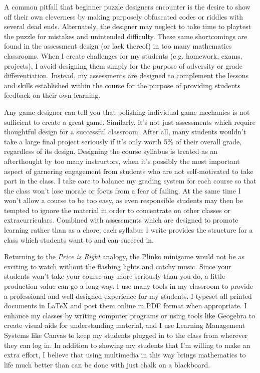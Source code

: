 \documentclass[11pt]{amsart}
\theoremstyle{plain}
\newcommand{\<}{\langle}
\renewcommand{\>}{\rangle}
\begin{document}
A common pitfall that beginner puzzle designers encounter is the desire to
show off their own cleverness by making purposely obfuscated codes or riddles
with several dead ends. Alternately, the designer may neglect to take time to
playtest the puzzle for mistakes and unintended difficulty. These same
shortcomings are found in the assessment design (or lack thereof) in too many
mathematics classrooms. When I create challenges for my students (e.g. homework,
exams, projects), I avoid designing them simply for the purpose of
adversity or grade differentiation. Instead, my assessments are designed to
complement the lessons and skills established within the course for the purpose
of providing students feedback on their own learning.

Any game designer can tell you that polishing individual game mechanics is not
sufficient to create a great game. Similarly, it's not just assessments which
require thoughtful design for a successful classroom.
After all, many students wouldn't take a large final
project seriously if it's only worth 5\% of their overall grade, regardless
of its design. Designing the
course syllabus is treated as an afterthought by too many instructors, when
it's possibly the most important aspect of garnering engagement from students
who are not self-motivated to take part in the class. I take care to
balance my grading system for each course so that the class won't lose
morale or focus from a fear of failing. At the same time I won't allow a
course to be too easy, as even responsible students may then
be tempted to ignore the material in order to
concentrate on other classes or extracurriculars. Combined with assessments
which are designed to promote learning rather than as a chore, each
syllabus I write provides the structure for a class which students want
to and can succeed in.

Returning to the
\textit{Price is Right} analogy, the Plinko minigame would not be as exciting
to watch without the flashing lights and catchy music. Since your students
won't take your course any more seriously than you do, a little production value
can go a long way.  I use many tools in
my classroom to provide a professional and well-designed experience for my
students. I typeset all printed documents in \LaTeX{} and post them online
in PDF format when appropriate.
I enhance my classes by writing computer programs
or using tools like Geogebra to create
visual aids for understanding material, and I use Learning Management Systems
like Canvas to keep my students plugged in to the class from wherever
they can log in. In addition to showing my students
that I'm willing to make an extra effort, I believe that using multimedia in
this way brings mathematics to life much better than can be done with just
chalk on a blackboard.
\end{document}
